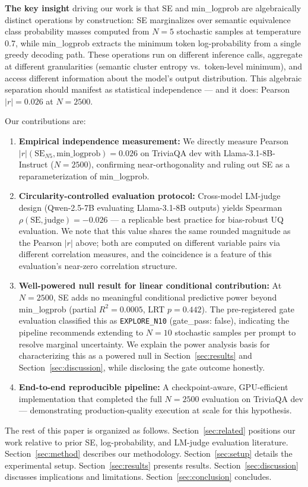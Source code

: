 \textbf{The key insight} driving our work is that SE and min\_logprob are algebraically distinct operations by construction: SE marginalizes over semantic equivalence class probability masses computed from $N=5$ stochastic samples at temperature 0.7, while min\_logprob extracts the minimum token log-probability from a single greedy decoding path. These operations run on different inference calls, aggregate at different granularities (semantic cluster entropy vs.\ token-level minimum), and access different information about the model's output distribution. This algebraic separation should manifest as statistical independence --- and it does: Pearson $|r| = 0.026$ at $N=2500$.

Our contributions are:

\begin{enumerate}
\item \textbf{Empirical independence measurement:} We directly measure Pearson $|r|(\text{SE}_{N5}, \text{min\_logprob}) = 0.026$ on TriviaQA dev with Llama-3.1-8B-Instruct ($N=2500$), confirming near-orthogonality and ruling out SE as a reparameterization of min\_logprob.

\item \textbf{Circularity-controlled evaluation protocol:} Cross-model LM-judge design (Qwen-2.5-7B evaluating Llama-3.1-8B outputs) yields Spearman $\rho(\text{SE}, \text{judge}) = -0.026$ --- a replicable best practice for bias-robust UQ evaluation. We note that this value shares the same rounded magnitude as the Pearson $|r|$ above; both are computed on different variable pairs via different correlation measures, and the coincidence is a feature of this evaluation's near-zero correlation structure.

\item \textbf{Well-powered null result for linear conditional contribution:} At $N=2500$, SE adds no meaningful conditional predictive power beyond min\_logprob (partial $R^2=0.0005$, LRT $p=0.442$). The pre-registered gate evaluation classified this as \texttt{EXPLORE\_N10} (gate\_pass: false), indicating the pipeline recommends extending to $N=10$ stochastic samples per prompt to resolve marginal uncertainty. We explain the power analysis basis for characterizing this as a powered null in Section~\ref{sec:results} and Section~\ref{sec:discussion}, while disclosing the gate outcome honestly.

\item \textbf{End-to-end reproducible pipeline:} A checkpoint-aware, GPU-efficient implementation that completed the full $N=2500$ evaluation on TriviaQA dev --- demonstrating production-quality execution at scale for this hypothesis.
\end{enumerate}

The rest of this paper is organized as follows. Section~\ref{sec:related} positions our work relative to prior SE, log-probability, and LM-judge evaluation literature. Section~\ref{sec:method} describes our methodology. Section~\ref{sec:setup} details the experimental setup. Section~\ref{sec:results} presents results. Section~\ref{sec:discussion} discusses implications and limitations. Section~\ref{sec:conclusion} concludes.
